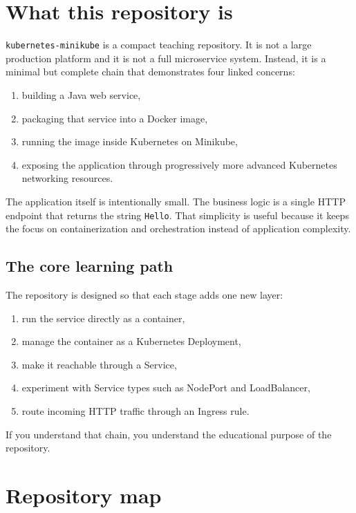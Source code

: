 \documentclass[11pt,a4paper]{article}
\newcommand{\repo}{\texttt{kubernetes-minikube}}
\newcommand{\cmd}[1]{\texttt{#1}}
\begin{document}
\tableofcontents
\newpage

\section{What this repository is}

\repo{} is a compact teaching repository. It is not a large production platform and it is not a full microservice system. Instead, it is a minimal but complete chain that demonstrates four linked concerns:

\begin{enumerate}
\item building a Java web service,
\item packaging that service into a Docker image,
\item running the image inside Kubernetes on Minikube,
\item exposing the application through progressively more advanced Kubernetes networking resources.
\end{enumerate}

The application itself is intentionally small. The business logic is a single HTTP endpoint that returns the string \cmd{Hello}. That simplicity is useful because it keeps the focus on containerization and orchestration instead of application complexity.

\subsection{The core learning path}

The repository is designed so that each stage adds one new layer:

\begin{enumerate}
\item run the service directly as a container,
\item manage the container as a Kubernetes Deployment,
\item make it reachable through a Service,
\item experiment with Service types such as NodePort and LoadBalancer,
\item route incoming HTTP traffic through an Ingress rule.
\end{enumerate}

If you understand that chain, you understand the educational purpose of the repository.

\section{Repository map}
\end{document}
